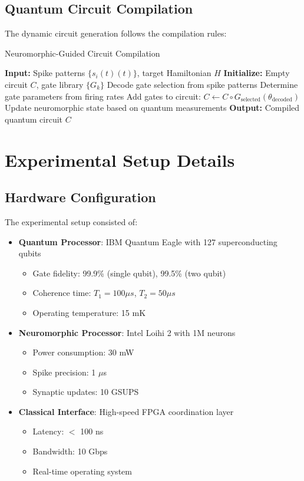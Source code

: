 \documentclass[arxiv,final,oneside,onecolumn]{arxiv-preprint-simple}
\newcommand{\spike}[1]{s_{#1}(t)}
\begin{document}
\subsection{Quantum Circuit Compilation}

The dynamic circuit generation follows the compilation rules:

\begin{algorithm}[H]
\caption{Neuromorphic-Guided Circuit Compilation}
\begin{algorithmic}[1]
\State \textbf{Input:} Spike patterns $\{\spike{i}(t)\}$, target Hamiltonian $H$
\State \textbf{Initialize:} Empty circuit $C$, gate library $\{G_k\}$
    \State Decode gate selection from spike patterns
    \State Determine gate parameters from firing rates
    \State Add gates to circuit: $C \leftarrow C \circ G_{\text{selected}}(\theta_{\text{decoded}})$
    \State Update neuromorphic state based on quantum measurements
\EndFor
\State \textbf{Output:} Compiled quantum circuit $C$
\end{algorithmic}
\end{algorithm}

\section{Experimental Setup Details}
\label{app:experimental}

\subsection{Hardware Configuration}

The experimental setup consisted of:

\begin{itemize}
\item \textbf{Quantum Processor}: IBM Quantum Eagle with 127 superconducting qubits
  \begin{itemize}
  \item Gate fidelity: 99.9\% (single qubit), 99.5\% (two qubit)
  \item Coherence time: $T_1 = 100\mu s$, $T_2 = 50\mu s$
  \item Operating temperature: 15 mK
  \end{itemize}
  
\item \textbf{Neuromorphic Processor}: Intel Loihi 2 with 1M neurons
  \begin{itemize}
  \item Power consumption: 30 mW
  \item Spike precision: 1 $\mu$s
  \item Synaptic updates: 10 GSUPS
  \end{itemize}
  
\item \textbf{Classical Interface}: High-speed FPGA coordination layer
  \begin{itemize}
  \item Latency: $<$ 100 ns
  \item Bandwidth: 10 Gbps
  \item Real-time operating system
  \end{itemize}
\end{itemize}
\end{document}

